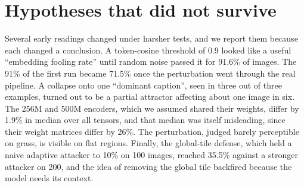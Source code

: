 \documentclass[10pt,twocolumn,letterpaper]{article}
\begin{document}
\section{Hypotheses that did not survive}
\label{app:revisions}

Several early readings changed under harsher tests, and we report them because each changed a conclusion. A token-cosine threshold of 0.9 looked like a useful ``embedding fooling rate'' until random noise passed it for 91.6\% of images. The 91\% of the first run became 71.5\% once the perturbation went through the real pipeline. A collapse onto one ``dominant caption'', seen in three out of three examples, turned out to be a partial attractor affecting about one image in six. The 256M and 500M encoders, which we assumed shared their weights, differ by 1.9\% in median over all tensors, and that median was itself misleading, since their weight matrices differ by 26\%. The perturbation, judged barely perceptible on grass, is visible on flat regions. Finally, the global-tile defense, which held a naive adaptive attacker to 10\% on 100 images, reached 35.5\% against a stronger attacker on 200, and the idea of removing the global tile backfired because the model needs its context.
\end{document}
